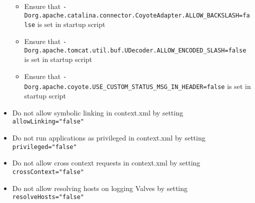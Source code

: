 \begin{itemize}
\begin{itemize}
		\item Ensure that \lstinline|-Dorg.apache.catalina.connector.CoyoteAdapter.ALLOW_BACKSLASH=false| is set in startup script
		\item Ensure that \lstinline|-Dorg.apache.tomcat.util.buf.UDecoder.ALLOW_ENCODED_SLASH=false| is set in startup script
		\item Ensure that \lstinline|-Dorg.apache.coyote.USE_CUSTOM_STATUS_MSG_IN_HEADER=false| is set in startup script
		\end{itemize}
	\item Do not allow symbolic linking in context.xml by setting \lstinline|allowLinking="false"|
	\item Do not run applications as privileged in context.xml by setting \lstinline|privileged="false"|
	\item Do not allow cross context requests in context.xml by setting \lstinline|crossContext="false"|
	\item Do not allow resolving hosts on logging Valves by setting \lstinline|resolveHosts="false"|
\end{itemize}



